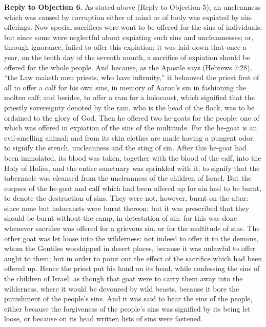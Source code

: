 \textbf{Reply to Objection 6.} As stated above (Reply to Objection 5), an uncleanness which was caused by corruption either of mind or of body was expiated by sin-offerings. Now special sacrifices were wont to be offered for the sins of individuals: but since some were neglectful about expiating such sins and uncleannesses; or, through ignorance, failed to offer this expiation; it was laid down that once a year, on the tenth day of the seventh month, a sacrifice of expiation should be offered for the whole people. And because, as the Apostle says (Hebrews 7:28), ``the Law maketh men priests, who have infirmity,'' it behooved the priest first of all to offer a calf for his own sins, in memory of Aaron's sin in fashioning the molten calf; and besides, to offer a ram for a holocaust, which signified that the priestly sovereignty denoted by the ram, who is the head of the flock, was to be ordained to the glory of God. Then he offered two he-goats for the people: one of which was offered in expiation of the sins of the multitude. For the he-goat is an evil-smelling animal; and from its skin clothes are made having a pungent odor; to signify the stench, uncleanness and the sting of sin. After this he-goat had been immolated, its blood was taken, together with the blood of the calf, into the Holy of Holies, and the entire sanctuary was sprinkled with it; to signify that the tabernacle was cleansed from the uncleanness of the children of Israel. But the corpses of the he-goat and calf which had been offered up for sin had to be burnt, to denote the destruction of sins. They were not, however, burnt on the altar: since none but holocausts were burnt thereon; but it was prescribed that they should be burnt without the camp, in detestation of sin: for this was done whenever sacrifice was offered for a grievous sin, or for the multitude of sins. The other goat was let loose into the wilderness: not indeed to offer it to the demons, whom the Gentiles worshipped in desert places, because it was unlawful to offer aught to them; but in order to point out the effect of the sacrifice which had been offered up. Hence the priest put his hand on its head, while confessing the sins of the children of Israel: as though that goat were to carry them away into the wilderness, where it would be devoured by wild beasts, because it bore the punishment of the people's sins. And it was said to bear the sins of the people, either because the forgiveness of the people's sins was signified by its being let loose, or because on its head written lists of sins were fastened.

